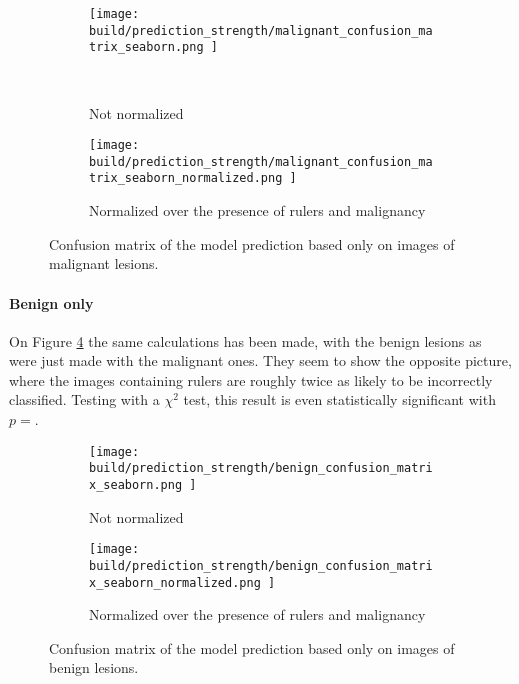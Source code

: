 \begin{figure}[h]
    \centering
    \begin{subfigure}[h]{0.45\textwidth}
        \texttt{[image: 
            build/prediction\_strength/malignant\_confusion\_matrix\_seaborn.png
        ]}
        \caption{Not normalized}
        \label{fig:prediction_strength_ruler_malignant_not_normalized}\
    \end{subfigure}
    \begin{subfigure}[h]{0.45\textwidth}
        \texttt{[image: 
            build/prediction\_strength/malignant\_confusion\_matrix\_seaborn\_normalized.png
        ]}
        \caption{Normalized over the presence of rulers and malignancy}
        \label{fig:prediction_strength_ruler_normalized_malignant}
    \end{subfigure}
    \caption{Confusion matrix of the model prediction based only on images of malignant lesions.}
    \label{fig:prediction_strength_ruler_malignant}
\end{figure}



\paragraph{Benign only}
On Figure \ref{fig:prediction_strength_ruler_benign} the same calculations has been made,
with the benign lesions as were just made with the malignant ones.
They seem to show the opposite picture, where the images containing rulers are roughly 
twice as likely to be incorrectly classified.
Testing with a $\chi^2$ test, this result is even statistically significant with 
$p=$.

\begin{figure}[h]
    \centering
    \begin{subfigure}[h]{0.45\textwidth}
        \texttt{[image: 
            build/prediction\_strength/benign\_confusion\_matrix\_seaborn.png
        ]}
        \caption{Not normalized}
        \label{fig:prediction_strength_ruler_benign}
    \end{subfigure}
    \begin{subfigure}[h]{0.45\textwidth}
        \texttt{[image: 
            build/prediction\_strength/benign\_confusion\_matrix\_seaborn\_normalized.png
        ]}
        \caption{Normalized over the presence of rulers and malignancy}
        \label{fig:prediction_strength_ruler_normalized_benign}
    \end{subfigure}
    \caption{Confusion matrix of the model prediction based only on images of benign lesions.}
\end{figure}

